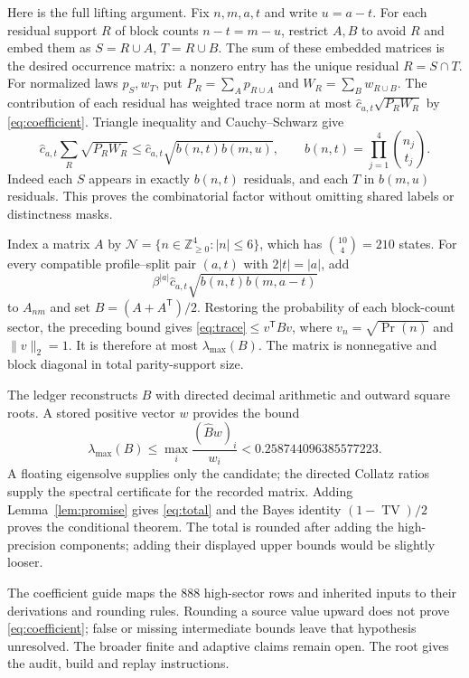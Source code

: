 \documentclass[11pt]{article}
\newcommand{\TV}{\operatorname{TV}}
\begin{document}
Here is the full lifting argument. Fix $n,m,a,t$ and write $u=a-t$.
For each residual support $R$ of block counts $n-t=m-u$, restrict
$A,B$ to avoid $R$ and embed them as $S=R\cup A$, $T=R\cup B$.
The sum of these embedded matrices is the desired occurrence matrix:
a nonzero entry has the unique residual $R=S\cap T$.
For normalized laws $p_S,w_T$, put
$P_R=\sum_Ap_{R\cup A}$ and $W_R=\sum_Bw_{R\cup B}$.
The contribution of each residual has weighted trace norm at most
$\widehat c_{a,t}\sqrt{P_RW_R}$ by \eqref{eq:coefficient}.
Triangle inequality and Cauchy--Schwarz give
\[
 \widehat c_{a,t}\sum_R\sqrt{P_RW_R}
 \le\widehat c_{a,t}\sqrt{b(n,t)b(m,u)},\qquad
 b(n,t)=\prod_{j=1}^4{n_j\choose t_j}.
\]
Indeed each $S$ appears in exactly $b(n,t)$ residuals, and each $T$
in $b(m,u)$ residuals. This proves the combinatorial factor without
omitting shared labels or distinctness masks.

Index a matrix $A$ by
$\mathcal N=\{n\in\mathbb Z_{\ge0}^4:|n|\le6\}$, which has
${10\choose4}=210$ states. For every compatible profile--split pair
$(a,t)$ with $2|t|=|a|$, add
\begin{equation}
 \beta^{|a|}\widehat c_{a,t}
                 \sqrt{b(n,t)b(m,a-t)}
 \label{eq:edge}
\end{equation}
to $A_{nm}$ and set $B=(A+A^{\mathsf T})/2$.
Restoring the probability of each block-count sector, the preceding
bound gives \eqref{eq:trace}$\le v^{\mathsf T}Bv$, where
$v_n=\sqrt{\Pr(n)}$ and $\|v\|_2=1$.
It is therefore at most $\lambda_{\max}(B)$.
The matrix is nonnegative and block diagonal in total parity-support size.

The ledger reconstructs $B$ with directed decimal arithmetic and
outward square roots. A stored positive vector $w$ provides the bound
\[
 \lambda_{\max}(B)\le\max_i\frac{(\widehat Bw)_i}{w_i}
           <0.258744096385577223.
\]
A floating eigensolve supplies only the candidate; the directed Collatz
ratios supply the spectral certificate for the recorded matrix.
Adding Lemma~\ref{lem:promise} gives \eqref{eq:total} and the Bayes identity
$(1-\TV)/2$ proves the conditional theorem. The total is rounded after
adding the high-precision components; adding their displayed upper
bounds would be slightly looser.

The coefficient guide  maps the 888 high-sector
rows and inherited inputs to their derivations and rounding rules.
Rounding a source value upward does not prove \eqref{eq:coefficient};
false or missing intermediate bounds leave that hypothesis unresolved.
The broader finite and adaptive claims remain open. The root
 gives the audit, build and replay instructions.
\end{document}
